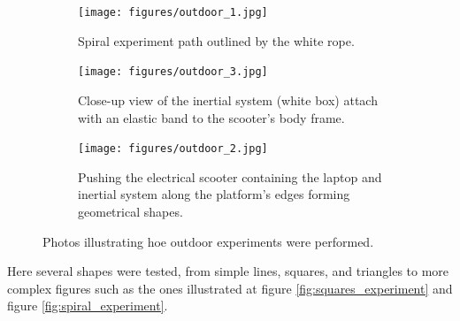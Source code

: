 \begin{figure}[!h]
    \centering
    \begin{subfigure}{0.8\textwidth}
        \centering
        \texttt{[image: figures/outdoor\_1.jpg]}
        \caption{ Spiral experiment path outlined by the white rope. }
        \label{fig:outdoor_1}
    \end{subfigure}

    \begin{subfigure}{0.40\textwidth}
        \centering
        \texttt{[image: figures/outdoor\_3.jpg]}
        \caption{ Close-up view of the inertial system (white box) attach with an elastic band to the scooter's body frame. }
        \label{fig:outdoor_2}
    \end{subfigure}
    \begin{subfigure}{0.40\textwidth}
        \centering
        \texttt{[image: figures/outdoor\_2.jpg]}
        \caption{ Pushing the electrical scooter containing the laptop and inertial system along the platform's edges forming geometrical shapes. }
        \label{fig:outdoor_3}
    \end{subfigure}
    \caption{ Photos illustrating hoe outdoor experiments were performed.}
    \label{fig:outdoor_experiments}
\end{figure}

Here several shapes were tested, from simple lines, squares, and triangles to more complex figures such as the ones illustrated at figure \ref{fig:squares_experiment} and figure \ref{fig:spiral_experiment}.

